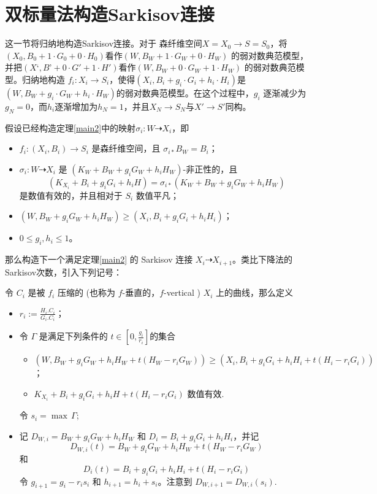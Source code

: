 \section{双标量法构造Sarkisov连接}
这一节将归纳地构造Sarkisov连接。对于 森纤维空间$X=X_{0}\to S=S_{0}$，将$(X_{0},B_{0}+1\cdot G_{0}+0\cdot H_{0}) $看作$(W,B_{W}+1\cdot G_{W}+0\cdot H_{W}) $ 的弱对数典范模型，并把$(X‘,B’+0\cdot G'+1\cdot H') $看作$(W,B_{W}+0\cdot G_{W}+1\cdot H_{W}) $ 的弱对数典范模型。归纳地构造  $f_{i}:X_{i}\to S_{i}$，使得$(X_{i},B_{i}+g_{i}\cdot G_{i}+h_{i}\cdot H_{i}) $是$(W,B_{W}+g_{i}\cdot G_{W}+h_{i}\cdot H_{W}) $的弱对数典范模型。在这个过程中，$g_{i}$ 逐渐减少为$g_{N}=0$，而$h_{i}$逐渐增加为$h_{N}=1$，并且$X_{N}\to S_{N}$与$X'\to S'$同构。

假设已经构造定理\ref{main2}中的映射$\sigma_{i}:W\dashrightarrow X_{i}$，即
\begin{itemize}
  \item $f_{i}:(X_{i},B_{i})\to S_{i}$ 是森纤维空间，且 $\sigma_{i*} B_{W}=B_{i}$；
  \item $\sigma_{i}:W\dashrightarrow  X_{i}$ 是 $(K_{W}+B_{W}+g_{i}G_{W}+h_{i}H_{W})$-非正性的，且
    \[(K_{X_{i}}+B_{i}+g_{i}G_{i}+h_{i}H)=\sigma_{i*}(K_{W}+B_{W}+g_{i}G_{W}+h_{i}H_{W}) \]
    是数值有效的，并且相对于 $S_{i}$ 数值平凡；
  \item $(W,B_{W}+g_{i}G_{W}+h_{i}H_{W})\geqslant (X_{i},B_{i}+g_{i}G_{i}+h_{i}H_{i})$；
  \item $0\leqslant g_{i},h_{i}\leqslant 1$。
\end{itemize}
那么构造下一个满足定理\ref{main2} 的 Sarkisov 连接 $X_{i}\dashrightarrow X_{i+1}$。类比下降法的Sarkisov次数，引入下列记号：
\begin{definition}\label{doubledegree}
  令 $C_{i}$ 是被 $f_{i}$ 压缩的 (也称为 $f$-垂直的，$f$-vertical )  $X_{i}$ 上的曲线，那么定义
  \begin{itemize}
    \item $r_{i}:=\frac{H_{i}.C_{i}}{G_{i}.C_{i}}$；
    \item 令 $\Gamma$ 是满足下列条件的 $t\in [0,\frac{g_{i}}{r_{i}}] $的集合
      \begin{itemize}
        \item\label{singularcondition} $\left(W,B_{W}+g_{i}G_{W}+h_{i}H_{W}+t(H_{W}-r_{i}G_{W})\right)\geqslant \left(X_{i},B_{i}+g_{i}G_{i}+h_{i}H_{i}+t\left(H_{i}-r_{i}G_{i}\right)\right)$；
        \item $K_{X_{i}}+B_{i}+g_{i}G_i+h_{i}H+t(H_{i}-r_{i}G_{i})$  数值有效.
      \end{itemize}
          令 $s_{i}=\max\, \Gamma $;
    \item 记 $D_{W,i}=B_{W}+g_{i}G_{W}+h_{i}H_{W}$ 和 $D_{i}=B_{i}+g_{i}G_{i}+h_{i}H_{i}$，并记
      \[D_{W,i}(t)=B_{W}+g_{i}G_{W}+h_{i}H_{W}+t(H_{W}-r_{i}G_{W})\]
      和
      \[D_{i}(t)=B_{i}+g_{i}G_{i}+h_{i}H_{i}+t (H_{i}-r_{i}G_{i})\]
      令 $g_{i+1}=g_{i}-r_{i}s_{i}$ 和 $h_{i+1}=h_{i}+s_{i}$。注意到 $D_{W,i+1}=D_{W,i}(s_{i})$.
  \end{itemize}
\end{definition}
